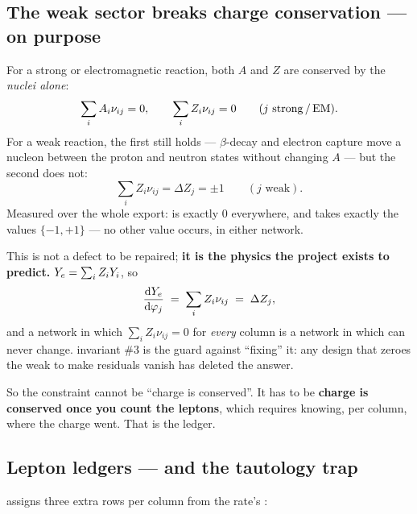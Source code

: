 \subsection{The weak sector breaks charge conservation --- on purpose}
\label{sec:weakbreaks}

For a strong or electromagnetic reaction, both $A$ and $Z$ are conserved by the
\emph{nuclei alone}:
%
\begin{equation}
\sum_i A_i \nu_{ij} = 0, \qquad
\sum_i Z_i \nu_{ij} = 0 \qquad (j \text{ strong\,/\,EM}).
\label{eq:strongcons}
\end{equation}
%
For a weak reaction, the first still holds --- $\beta$-decay and electron
capture move a nucleon between the proton and neutron states without changing
$A$ --- but the second does not:
%
\begin{equation}
\sum_i Z_i \nu_{ij} = \Delta Z_j = \pm 1 \qquad (j \text{ weak}).
\label{eq:weakdz}
\end{equation}
%
Measured over the whole export:  is exactly
0 everywhere, and  takes exactly the values $\{-1, +1\}$
--- no other value occurs, in either network.\derivedhere

This is not a defect to be repaired; \textbf{it is the physics the project
exists to predict.} $Y_{e} = \sum_i Z_iY_i$, so
%
\begin{equation}
\frac{\mathrm{d} Y_{e}}{\mathrm{d} \varphi_j} \;=\; \sum_i Z_i \nu_{ij} \;=\; \Delta Z_j,
\label{eq:dyedphi}
\end{equation}
%
and a network in which $\sum_i Z_i\nu_{ij} = 0$ for \emph{every} column is a
network in which \Ye{} can never change.  invariant \#3 is the
guard against ``fixing'' it: any design that zeroes the weak \dYe{} to make
residuals vanish has deleted the answer.

So the constraint cannot be ``charge is conserved''. It has to be \textbf{charge
is conserved once you count the leptons}, which requires knowing, per column,
where the charge went. That is the ledger.

\subsection{Lepton ledgers --- and the tautology trap}
\label{sec:ledgers}

 assigns three extra rows per column from the rate's
:

